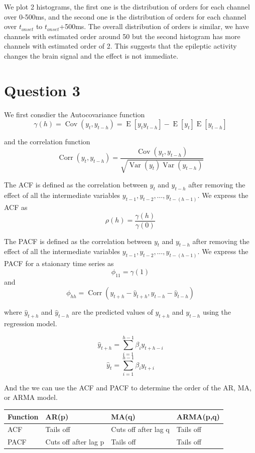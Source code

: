 \documentclass{article}
\DeclareMathOperator{\Cov}{Cov}
\DeclareMathOperator{\Corr}{Corr}
\DeclareMathOperator{\Var}{Var}
\DeclareMathOperator{\E}{E}
\begin{document}
We plot 2 histograms, the first one is the distribution of orders for each channel over 0-500ms, and the second one is the distribution of orders for each channel over \(t_{onset}\) to \(t_{onset}\)+500ms. The overall distribution of orders is similar, we have channels with estimated order around 50 but the second histogram has more channels with estimated order of 2. This suggests that the epileptic activity changes the brain signal and the effect is not immediate.


\newpage
\section*{Question 3}
We first consdier the Autocovariance function
\[\gamma(h)  = \Cov(y_t, y_{t-h}) = \E[y_t y_{t-h}] - \E[y_t] \E[y_{t-h}]\]

and the correlation function
\[\Corr(y_t, y_{t-h}) = \frac{\Cov(y_t, y_{t-h})}{\sqrt{\Var(y_t) \Var(y_{t-h})}}\]

The ACF is defined as the correlation between $y_t$ and $y_{t-h}$ after removing the effect of all the intermediate variables $y_{t-1}, y_{t-2}, \ldots, y_{t-(h-1)}$. We express the ACF as
\[\rho(h) = \frac{\gamma(h)}{\gamma(0)}\]

The PACF is defined as the correlation between $y_t$ and $y_{t-h}$ after removing the effect of all the intermediate variables $y_{t-1}, y_{t-2}, \ldots, y_{t-(h-1)}$. We express the PACF for a staionary time series as
\[\phi_{11} = \gamma(1)\]
and 
\[\phi_{hh} = \Corr(y_{t+h} - \hat y_{t+h}, y_{t-h} - \hat y_{t-h})\]

where $\hat y_{t+h}$ and $\hat y_{t-h}$ are the predicted values of $y_{t+h}$ and $y_{t-h}$ using the regression model.

\[\hat y_{t+h} = \sum_{i=1}^{h-1} \beta_{i} y_{t + h - i }\]
\[\hat y_{t} = \sum_{i=1}^{h-1} \beta_{i} y_{t + i }\]

And the we can use the ACF and PACF to determine the order of the AR, MA, or ARMA model.
\begin{table}[!ht]
  \centering
  \begin{tabular}{|l|l|l|l|}
  \hline
      Function & AR(p) & MA(q) & ARMA(p,q) \\ \hline
      ACF & Tails off & Cuts off after lag q & Tails off \\ \hline
      PACF & Cuts off after lag p & Tails off & Tails off \\ \hline
  \end{tabular}
\end{table}
\end{document}
